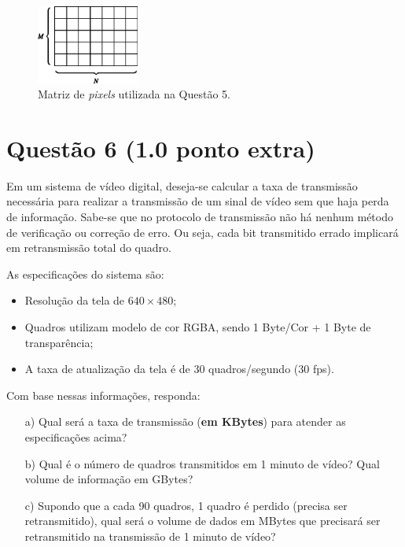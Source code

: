 \documentclass[a4paper,11pt]{article}
\begin{document}
\begin{figure}[H]
\centering
\includegraphics[width=0.3\textwidth]{imgs/matriz}
\caption{Matriz de {\it pixels} utilizada na Questão 5.}
\label{fig:matriz}
\end{figure}

\pagebreak

\section*{Questão 6 (1.0 ponto extra)}
Em um sistema de vídeo digital, deseja-se calcular a taxa de transmissão
necessária para realizar a transmissão de um sinal de vídeo sem que haja perda
de informação. Sabe-se que no protocolo de transmissão não há nenhum método de
verificação ou correção de erro. Ou seja, cada bit transmitido errado implicará
em retransmissão total do quadro. 

As especificações do sistema são:

\begin{itemize}
\item Resolução da tela de $640 \times 480$;
\item Quadros utilizam modelo de cor RGBA, sendo 1 Byte/Cor + 1 Byte de
transparência;
\item A taxa de atualização da tela é de 30 quadros/segundo (30 fps).
\end{itemize}

Com base nessas informações, responda:

\begin{itemize}
    \item [a)] Qual será a taxa de transmissão ({\bf em KBytes}) para atender as
especificações acima?
    \item [b)] Qual é o número de quadros transmitidos em 1 minuto de vídeo?
Qual volume de informação em GBytes?
    \item [c)] Supondo que a cada 90 quadros, 1 quadro é perdido (precisa ser
retransmitido), qual será o volume de dados em MBytes que precisará ser
retransmitido na transmissão de 1 minuto de vídeo?
\end{itemize}
\end{document}
